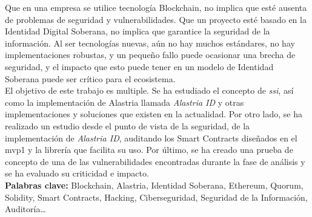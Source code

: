Que en una empresa se utilice tecnología Blockchain, no implica que esté ausenta de problemas de seguridad y vulnerabilidades. Que un proyecto esté basado en la Identidad Digital Soberana, no implica que garantice la seguridad de la información. Al ser tecnologías nuevas, aún no hay muchos estándares, no hay implementaciones robustas, y un pequeño fallo puede ocasionar una brecha de seguridad, y el impacto que esto puede tener en un modelo de Identidad Soberana puede ser crítico para el ecosistema.\\

El objetivo de este trabajo es multiple. Se ha estudiado el concepto de \textit{\acrfull{ssi}}, así como la implementación de Alastria llamada \textit{Alastria ID} y otras implementaciones y soluciones que existen en la actualidad. Por otro lado, se ha realizado un estudio desde el punto de vista de la seguridad, de la implementación de \textit{Alastria ID}, auditando los Smart Contracts diseñados en el \acrshort{mvp}1 y la librería que facilita su uso. Por último, se ha creado una prueba de concepto de una de las vulnerabilidades encontradas durante la fase de análisis y se ha evaluado su criticidad e impacto.\\

\textbf{Palabras clave:} Blockchain, Alastria, Identidad Soberana, Ethereum, Quorum, Solidity, Smart Contracts, Hacking, Ciberseguridad, Seguridad de la Información, Auditoría\ldots

